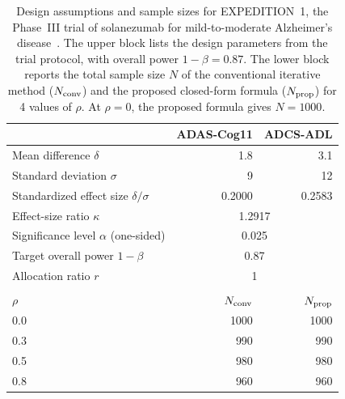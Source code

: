 \begin{table}[ht]
\centering
\small
\caption{Design assumptions and sample sizes for EXPEDITION~1, the Phase~III trial of solanezumab for mild-to-moderate Alzheimer's disease~\citep{Doody2014}. The upper block lists the design parameters from the trial protocol, with overall power $1 - \beta = 0.87$. The lower block reports the total sample size $N$ of the conventional iterative method ($N_{\rm conv}$) and the proposed closed-form formula ($N_{\rm prop}$) for 4 values of $\rho$. At $\rho = 0$, the proposed formula gives $N = 1000$.}
\label{tab:real_example}
\begin{threeparttable}
\begin{tabular}{lrr}
\hline
 & ADAS-Cog11 & ADCS-ADL \\
\hline
Mean difference $\delta$ & 1.8 & 3.1 \\
Standard deviation $\sigma$ & 9 & 12 \\
Standardized effect size $\delta / \sigma$ & 0.2000 & 0.2583 \\
\hline
Effect-size ratio $\kappa$ & \multicolumn{2}{c}{1.2917} \\
Significance level $\alpha$ (one-sided) & \multicolumn{2}{c}{0.025} \\
Target overall power $1 - \beta$ & \multicolumn{2}{c}{0.87} \\
Allocation ratio $r$ & \multicolumn{2}{c}{1} \\
\hline
\multicolumn{3}{c}{} \\[-1.8ex]
$\rho$ & $N_{\rm conv}$ & $N_{\rm prop}$ \\
\hline
0.0 & 1000 & 1000 \\
0.3 & 990 & 990 \\
0.5 & 980 & 980 \\
0.8 & 960 & 960 \\
\hline
\end{tabular}
\end{threeparttable}
\end{table}
